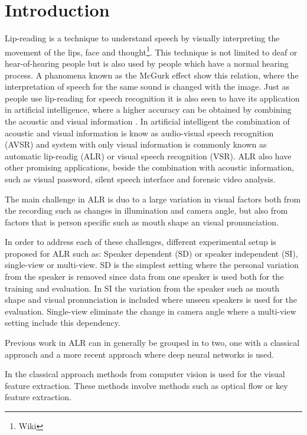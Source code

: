 \section{Introduction}
Lip-reading is a technique to understand speech by visually interpreting the movement of the lips, face and thought\footnote{Wiki}.
This technique is not limited to deaf or hear-of-hearing people but is also used by people which have a normal hearing process.
A phanomena known as the McGurk effect\cite{mcGurk} show this relation, where the interpretation of speech for the same sound is changed with the image.
Just as people use lip-reading for speech recognition it is also seen to have its application in artificial intelligence, where a higher accuracy can be obtained by combining the acoustic and visual information \cite{Ngiam2011}.
In artificial intelligent the combination of acoustic and visual information is know as audio-visual speech recognition (AVSR) and system with only visual information is commonly known as automatic lip-readig (ALR) or visual speech recognition (VSR).
ALR also have other promising applications, beside the combination with acoustic information, such as visual password, silent speech interface and forensic video analysis.

The main challenge in ALR is duo to a large variation in visual factors both from the recording such as changes in illumination and camera angle\cite{Potamianos2003}, but also from factors that is person specific such as mouth shape an visual pronunciation. 

In order to address each of these challenges, different experimental setup is proposed for ALR such as:
Speaker dependent (SD) or speaker independent (SI), single-view or multi-view.
SD is the simplest setting where the personal variation from the speaker is removed since data from one speaker is used both for the training and evaluation.
In SI the variation from the speaker such as mouth shape and visual pronunciation is included where unseen speakers is used for the evaluation.
Single-view eliminate the change in camera angle where a multi-view setting include this dependency.

Previous work in ALR can in generally be grouped in to two, one with a classical approach and a more recent approach where deep neural networks is used.

In the classical approach methods from computer vision is used for the visual feature extraction.
These methods involve methods such as optical flow\cite{Shaikh2010} or key feature extraction\cite{Li2008}.

